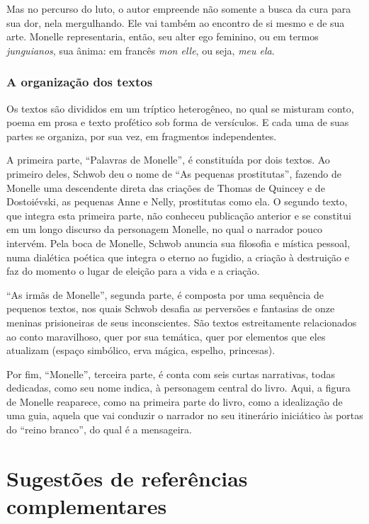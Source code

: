 \documentclass[12pt]{extarticle}
\begin{document}
Mas no percurso do luto, o autor empreende
não somente a busca da cura para sua dor, nela mergulhando.
Ele vai também ao encontro de si mesmo e
de sua arte. Monelle representaria, então, seu alter ego
feminino, ou em termos \emph{junguianos}, sua ânima: em francês \emph{mon
elle}, ou seja, \emph{meu ela}.

\subsubsection{A organização dos textos}

Os textos são divididos em um tríptico heterogêneo, no qual se
misturam conto, poema em prosa e texto profético sob
forma de versículos. E cada uma de suas partes se organiza,
por sua vez, em fragmentos independentes.

A primeira parte, ``Palavras de Monelle'', é constituída
por dois textos. Ao primeiro deles, Schwob deu o nome
de ``As pequenas prostitutas'', fazendo de Monelle uma
descendente direta das criações de Thomas de Quincey
e de Dostoiévski, as pequenas Anne e Nelly, prostitutas
como ela. O segundo texto, que integra esta primeira parte,
não conheceu publicação anterior e se constitui em um
longo discurso da personagem Monelle, no qual o narrador
pouco intervém. Pela boca de Monelle, Schwob
anuncia sua filosofia e mística pessoal, numa dialética
poética que integra o eterno ao fugidio, a criação à destruição
e faz do momento o lugar de eleição para a
vida e a criação.

``As irmãs de Monelle'', segunda parte, é composta por uma
sequência de pequenos textos, nos quais Schwob desafia
as perversões e fantasias de onze meninas prisioneiras
de seus inconscientes. São textos estreitamente relacionados
ao conto maravilhoso, quer por sua temática,
quer por elementos que eles atualizam (espaço simbólico,
erva mágica, espelho, princesas).

Por fim, ``Monelle'', terceira parte, é conta com
seis curtas narrativas, todas dedicadas, como seu
nome indica, à personagem central do livro. Aqui, a
figura de Monelle reaparece, como na primeira parte
do livro, como a idealização de uma guia, aquela que
vai conduzir o narrador no seu itinerário iniciático às
portas do ``reino branco'', do qual é a mensageira.

\section{Sugestões de referências complementares}\label{sugestoes}
\end{document}
